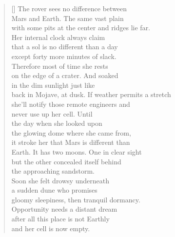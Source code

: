 \documentclass{book}
\begin{document}
\begin{verse}[\versewidth]
    The rover sees no difference between\\
    Mars and Earth. The same vast plain\\
    with some pits at the center and ridges lie far. \\
    Her internal clock always claim\\
    that a sol is no different than a day\\
    except forty more minutes of slack.\\
    Therefore most of time she rests\\
    on the edge of a crater. And soaked\\
    in the dim sunlight just like\\
    back in Mojave, at dusk. If weather permits a stretch \\
    she'll notify those remote engineers and\\
    never use up her cell. Until\\
    the day when she looked upon\\
    the glowing dome where she came from,\\
    it stroke her that Mars is different than\\
    Earth. It has two moons. One in clear sight\\
    but the other concealed itself behind\\
    the approaching sandstorm.\\
    Soon she felt drowsy underneath\\
    a sudden dune who promises\\
    gloomy sleepiness, then tranquil dormancy.\\
    Opportunity needs a distant dream\\
    after all this place is not Earthly\\
    and her cell is now empty.\\
\end{verse}

\newpage
\end{document}
